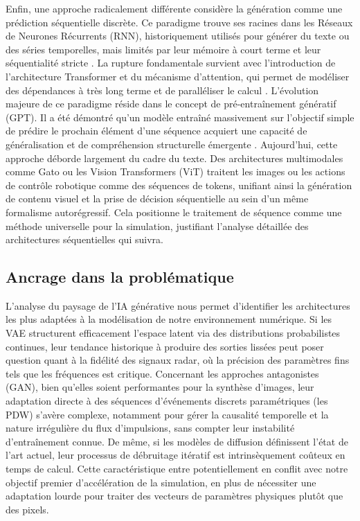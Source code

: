 Enfin, une approche radicalement différente considère la génération comme une prédiction séquentielle discrète. Ce paradigme trouve ses racines dans les Réseaux de Neurones Récurrents (RNN), historiquement utilisés pour générer du texte ou des séries temporelles, mais limités par leur mémoire à court terme et leur séquentialité stricte \cite{graves_generating_2014}. La rupture fondamentale survient avec l'introduction de l'architecture Transformer et du mécanisme d'attention, qui permet de modéliser des dépendances à très long terme et de paralléliser le calcul \cite{vaswani_attention_2017}.
L'évolution majeure de ce paradigme réside dans le concept de pré-entraînement génératif (GPT). Il a été démontré qu'un modèle entraîné massivement sur l'objectif simple de prédire le prochain élément d'une séquence acquiert une capacité de généralisation et de compréhension structurelle émergente \cite{radford_improving_2018}. Aujourd'hui, cette approche déborde largement du cadre du texte. Des architectures multimodales comme Gato \cite{reed_generalist_2022} ou les Vision Transformers (ViT) \cite{dosovitskiy_image_2020} traitent les images ou les actions de contrôle robotique comme des séquences de tokens, unifiant ainsi la génération de contenu visuel et la prise de décision séquentielle au sein d'un même formalisme autorégressif. Cela positionne le traitement de séquence comme une méthode universelle pour la simulation, justifiant l'analyse détaillée des architectures séquentielles qui suivra.

\subsection{Ancrage dans la problématique}
L'analyse du paysage de l'IA générative nous permet d'identifier les architectures les plus adaptées à la modélisation de notre environnement numérique. Si les VAE structurent efficacement l'espace latent via des distributions probabilistes continues, leur tendance historique à produire des sorties lissées peut poser question quant à la fidélité des signaux radar, où la précision des paramètres fins tels que les fréquences est critique. Concernant les approches antagonistes (GAN), bien qu'elles soient performantes pour la synthèse d'images, leur adaptation directe à des séquences d'événements discrets paramétriques (les PDW) s'avère complexe, notamment pour gérer la causalité temporelle et la nature irrégulière du flux d'impulsions, sans compter leur instabilité d'entraînement connue. De même, si les modèles de diffusion définissent l'état de l'art actuel, leur processus de débruitage itératif est intrinsèquement coûteux en temps de calcul. Cette caractéristique entre potentiellement en conflit avec notre objectif premier d'accélération de la simulation, en plus de nécessiter une adaptation lourde pour traiter des vecteurs de paramètres physiques plutôt que des pixels.\\

